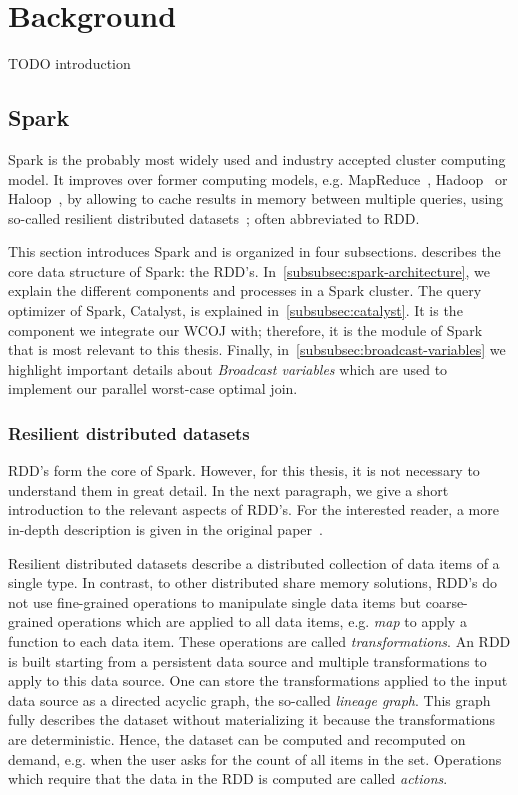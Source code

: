 \section{Background}\label{sec:background}

TODO introduction
\subsection{Spark}\label{subsec:spark}
Spark is the probably most widely used and industry accepted cluster computing model.
It improves over former computing models, e.g. MapReduce~\cite{mapreduce}, Hadoop~\cite{hadoop} or Haloop~\cite{haloop},
by allowing to cache results in memory between multiple queries, using so-called resilient
distributed datasets~\cite{rdd}; often abbreviated to RDD.

This section introduces Spark and is organized in four subsections.
 describes the core data structure of Spark: the RDD's.
In~\cref{subsubsec:spark-architecture}, we explain the different components and processes in a Spark cluster.
The query optimizer of Spark, Catalyst, is explained in~\cref{subsubsec:catalyst}.
It is the component we integrate our \textsc{WCOJ} with;
therefore, it is the module of Spark that is most relevant to this thesis.
Finally, in~\cref{subsubsec:broadcast-variables} we highlight important details about \textit{Broadcast variables} which are used
to implement our parallel worst-case optimal join.

\subsubsection{Resilient distributed datasets} \label{subsubsec:resilient-distributed-datasets}
RDD's form the core of Spark.
However, for this thesis, it is not necessary to understand them in great detail.
In the next paragraph, we give a short introduction to the relevant aspects of RDD's.
For the interested reader, a more in-depth description is given in the original paper~\cite{rdd}.

Resilient distributed datasets describe a distributed collection of data items of a single type.
In contrast, to other distributed share memory solutions, RDD's do not use fine-grained
operations to manipulate single data items but coarse-grained operations which are applied
to all data items, e.g. \textit{map} to apply a function to each data item.
These operations are called \textit{transformations}.
An RDD is built starting from a persistent data source and multiple transformations to
apply to this data source.
One can store the transformations applied to the input data source as a directed acyclic graph, the so-called \textit{lineage graph}.
This graph fully describes the dataset without materializing it because the transformations are deterministic.
Hence, the dataset can be computed and recomputed on demand, e.g. when the user asks for the count
of all items in the set.
Operations which require that the data in the RDD is computed are called \textit{actions}.

